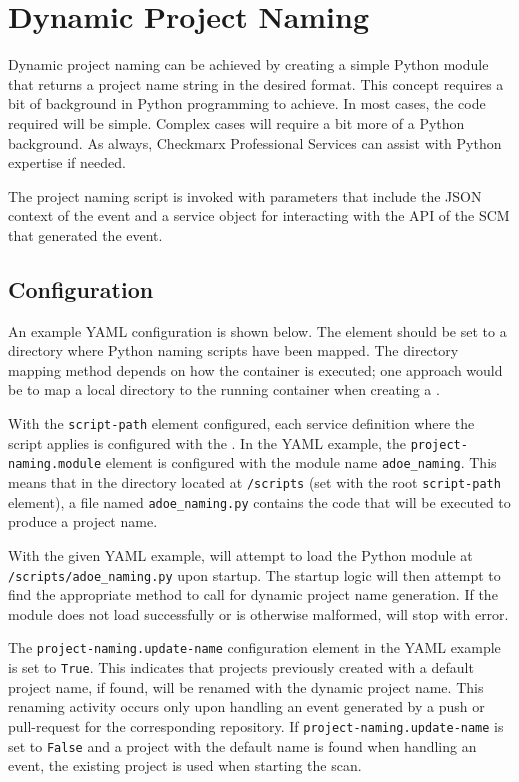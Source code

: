 \chapter{Dynamic Project Naming}\label{sec:project-naming}


Dynamic project naming can be achieved by creating a simple Python module that returns
a project name string in the desired format.  This concept requires a bit of background
in Python programming to achieve.  In most cases, the code required will be simple.
Complex cases will require a bit more of a Python background.  As always, 
Checkmarx Professional Services can assist with Python expertise if needed.

The project naming script is invoked with parameters that include the JSON context of the event
and a service object for interacting with the API of the SCM that generated the event.


\section{Configuration}

An example YAML configuration is shown below.  The  element
should be set to a directory where Python naming scripts have been mapped.  The directory
mapping method depends on how the container is executed; one approach would be to map
a local directory to the running \cxoneflow container when creating a
.

With the \texttt{script-path} element configured, each service definition where the script applies
is configured with the .  In the YAML
example, the \texttt{project-naming.module} element is configured with the module name \texttt{adoe\_naming}.
This means that in the directory located at \texttt{/scripts} (set with the root \texttt{script-path} element),
a file named \texttt{adoe\_naming.py} contains the code that will be executed to produce a project name.

With the given YAML example, \cxoneflow will attempt to load the Python module at \texttt{/scripts/adoe\_naming.py}
upon startup.  The startup logic will then attempt to find the appropriate method to call for dynamic project
name generation.  If the module does not load successfully or is otherwise malformed, \cxoneflow will stop with error.

The \texttt{project-naming.update-name} configuration element in the YAML example is set to \texttt{True}.  This indicates that
projects previously created with a default project name, if found, will be renamed with the dynamic project name.  This
renaming activity occurs only upon handling an event generated by a push or pull-request for the corresponding
repository.  If \texttt{project-naming.update-name} is set to \texttt{False} and a project with the default name
is found when handling an event, the existing project is used when starting the scan.


